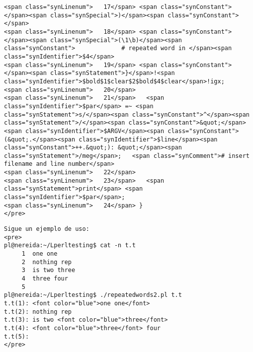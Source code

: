 \begin{verbatim}
<span class="synLinenum">   17</span> <span class="synConstant">        </span><span class="synSpecial">)</span><span class="synConstant">   </span>
<span class="synLinenum">   18</span> <span class="synConstant">        </span><span class="synSpecial">(\1\b)</span><span class="synConstant">             # repeated word in </span><span class="synIdentifier">$4</span>
<span class="synLinenum">   19</span> <span class="synConstant">  </span><span class="synStatement">}</span>!<span class="synIdentifier">$bold$1$clear$2$bold$4$clear</span>!igx;
<span class="synLinenum">   20</span> 
<span class="synLinenum">   21</span>   <span class="synIdentifier">$par</span> =~ <span class="synStatement">s/</span><span class="synConstant">^</span><span class="synStatement">/</span><span class="synConstant">&quot;</span><span class="synIdentifier">$ARGV</span><span class="synConstant">(&quot;.</span><span class="synIdentifier">$line</span><span class="synConstant">++.&quot;): &quot;</span><span class="synStatement">/meg</span>;   <span class="synComment"># insert filename and line number</span>
<span class="synLinenum">   22</span> 
<span class="synLinenum">   23</span>   <span class="synStatement">print</span> <span class="synIdentifier">$par</span>;
<span class="synLinenum">   24</span> }
</pre>

\end{verbatim}%



\begin{verbatim}
Sigue un ejemplo de uso:
<pre>
pl@nereida:~/Lperltesting$ cat -n t.t
     1  one one
     2  nothing rep
     3  is two three
     4  three four
     5
pl@nereida:~/Lperltesting$ ./repeatedwords2.pl t.t
t.t(1): <font color="blue">one one</font>
t.t(2): nothing rep
t.t(3): is two <font color="blue">three</font>
t.t(4): <font color="blue">three</font> four
t.t(5):
</pre>
\end{verbatim}

